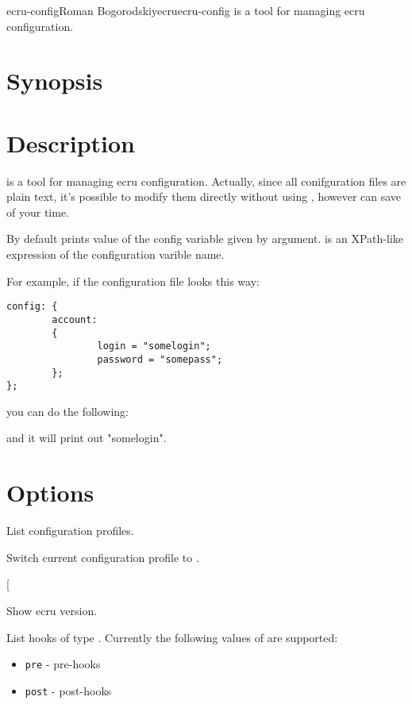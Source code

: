 \documentclass[english]{article}
\begin{document}
\begin{Name}{1}{ecru-config}{Roman Bogorodskiy}{ecru}{ecru-config}
	 is a tool for managing ecru configuration.
\end{Name}

\section{Synopsis}

 

  

 

 

\section{Description}
 is a tool for managing ecru configuration. Actually, since
all conifguration files are plain text, it's possible to modify them directly
without using , however  can save of your
time.

By default  prints value of the config variable given by
 argument.  is an XPath-like 
expression of the configuration varible name.

For example, if the configuration file looks this way:

\begin{verbatim}
config: {
        account:
        {
                login = "somelogin";
                password = "somepass";
        };
};
\end{verbatim}

you can do the following:

 

and it will print out "somelogin".

\section{Options}

\begin{Description}\setlength{\itemsep}{0cm}
\item[\Opt{-l}] List configuration profiles.
\item[\OptArg{-s}{path} Switch current configuration profile to \Arg{path}.
\item[\Opt{-v}] Show ecru version.
\item[\OptArg{-h}{hook}] List hooks of type . Currently the following
values of  are supported:
	\begin{itemize}
		\item \texttt{pre} - pre-hooks
		\item \texttt{post} - post-hooks
	\end{itemize}
\end{Description}
\end{document}
